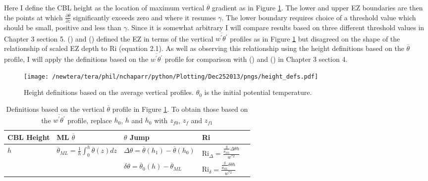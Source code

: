 Here I define the \acs{CBL} height as the location of maximum vertical $\overline{\theta}$ gradient as in Figure \ref{fig:hdefs}.  The lower and upper \acs{EZ} boundaries are then the points at which $\frac{\partial \overline{\theta}}{\partial z}$ significantly exceeds zero and where it resumes $\gamma$.  The lower boundary requires choice of a threshold value which should be small, positive and less than $\gamma$. Since it is somewhat arbitrary I will compare results based on three different threshold values in Chapter 3 section 5.  \citeauthor{FedConzMir04} (\citeyear{FedConzMir04}) and \citeauthor{BrooksFowler2} (\citeyear{BrooksFowler2}) defined the \acs{EZ} in terms of the vertical $\overline{w^{'}\theta^{'}}$ profiles as in Figure \ref{fig:hdefs} but disagreed on the shape of the relationship of scaled \acs{EZ} depth to \acs{Ri} (equation 2.1).  As well as observing this relationship using the height definitions based on the $\overline{\theta}$ profile, I will apply the definitions based on the $\overline{w^{'}\theta^{'}}$ profile for comparison with \citeauthor{BrooksFowler2} (\citeyear{BrooksFowler2}) and \citeauthor{FedConzMir04} (\citeyear{FedConzMir04}) in Chapter 3 section 4.\\  

\begin{figure}[htbp]
    \centering
    \texttt{[image: /newtera/tera/phil/nchaparr/python/Plotting/Dec252013/pngs/height\_defs.pdf]}
    \caption[Height definitions]{Height definitions based on the average vertical profiles. $\theta_{0}$ is the initial potential temperature.}
    \label{fig:hdefs}   %
\end{figure}

\begin{table}[htbp]
    \begin{center}
    \begin{tabular}{ p{2cm} p{4cm}  p{3cm}  p{3cm} p{3cm} }
      \acs{CBL} Height & \acs{ML} $\overline{\theta}$ & $\theta$ Jump & \acs{Ri} \\ \hline 
       $h$ & $\overline{\theta}_{ML} = \frac{1}{h}\int^{h}_{0}\overline{\theta}(z)dz$ & $\Delta \theta=\overline{\theta}(h_{1})-\overline{\theta}(h_{0})$ & \acs{Ri}$_{\Delta}=\frac{\frac{g}{\overline{\theta}_{ML}}\Delta \theta h}{w^{*2}}$  \\ [.3cm] %
        
       & &$\delta \theta = \overline{\theta}_{0}(h)- \overline{\theta}_{ML}$ & \acs{Ri}$_{\delta}=\frac{\frac{g}{\overline{\theta}_{ML}} \delta \theta h}{w^{*2}}$ \\ \hline
      \end{tabular}
\caption[Height definitions]{Definitions based on the vertical $\overline{\theta}$ profile in Figure \ref{fig:hdefs}.  To obtain those based on the $\overline{w^{'}\theta^{'}}$ profile, replace $h_{0}$, $h$ and $h_{0}$ with $z_{f0}$, $z_{f}$ and $z_{f1}$}
\label{table:reldefs}   
\end{center}    
\end{table}

